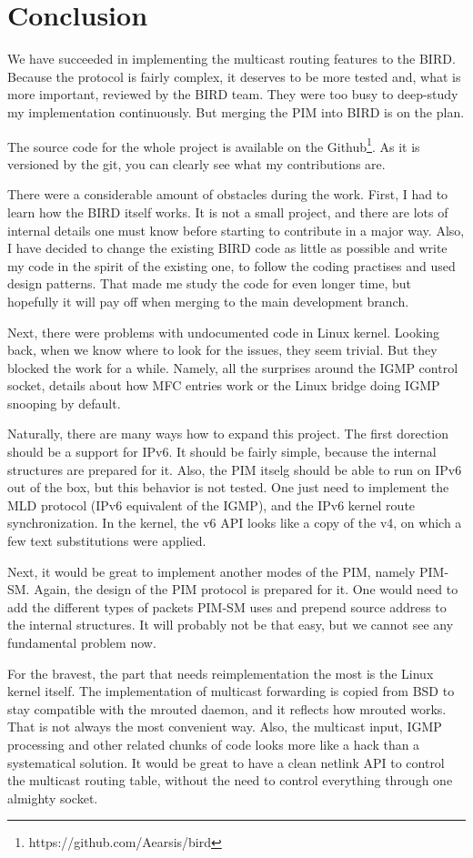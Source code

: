 \chapter*{Conclusion}

We have succeeded in implementing the multicast routing features to the BIRD.
Because the protocol is fairly complex, it deserves to be more tested and, what
is more important, reviewed by the BIRD team. They were too busy to deep-study
my implementation continuously. But merging the PIM into BIRD is on the plan.

The source code for the whole project is available on the
Github\footnote{https://github.com/Aearsis/bird}. As it is versioned by the
git, you can clearly see what my contributions are.

There were a considerable amount of obstacles during the work. First, I had to
learn how the BIRD itself works. It is not a small project, and there are lots
of internal details one must know before starting to contribute in a major way.
Also, I have decided to change the existing BIRD code as little as possible and
write my code in the spirit of the existing one, to follow the coding practises
and used design patterns. That made me study the code for even longer time, but
hopefully it will pay off when merging to the main development branch.

Next, there were problems with undocumented code in Linux kernel. Looking back,
when we know where to look for the issues, they seem trivial. But they blocked
the work for a while. Namely, all the surprises around the IGMP control socket,
details about how MFC entries work or the Linux bridge doing IGMP snooping by
default.

Naturally, there are many ways how to expand this project. The first dorection
should be a support for IPv6. It should be fairly simple, because the internal
structures are prepared for it. Also, the PIM itselg should be able to run on
IPv6 out of the box, but this behavior is not tested. One just need to
implement the MLD protocol (IPv6 equivalent of the IGMP), and the IPv6 kernel
route synchronization. In the kernel, the v6 API looks like a copy of the v4,
on which a few text substitutions were applied.

Next, it would be great to implement another modes of the PIM, namely PIM-SM.
Again, the design of the PIM protocol is prepared for it. One would need to
add the different types of packets PIM-SM uses and prepend source address to
the internal structures. It will probably not be that easy, but we cannot see
any fundamental problem now.

For the bravest, the part that needs reimplementation the most is the Linux
kernel itself. The implementation of multicast forwarding is copied from BSD to
stay compatible with the mrouted daemon, and it reflects how mrouted works.
That is not always the most convenient way. Also, the multicast input, IGMP
processing and other related chunks of code looks more like a hack than
a systematical solution. It would be great to have a clean netlink API to
control the multicast routing table, without the need to control everything
through one almighty socket.
